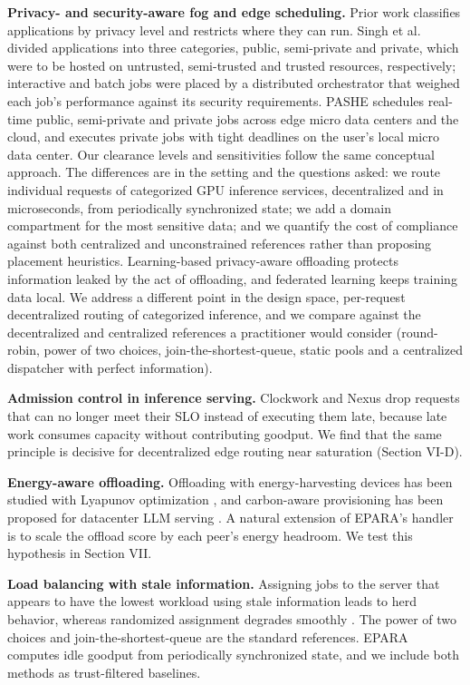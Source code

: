 \documentclass[journal]{IEEEtran}
\begin{document}
\textbf{Privacy- and security-aware fog and edge scheduling.} Prior work classifies applications by privacy level and restricts where they can run. Singh et al. \cite{singh2021fog} divided applications into three categories, public, semi-private and private, which were to be hosted on untrusted, semi-trusted and trusted resources, respectively; interactive and batch jobs were placed by a distributed orchestrator that weighed each job's performance against its security requirements. PASHE \cite{fizza2018pashe} schedules real-time public, semi-private and private jobs across edge micro data centers and the cloud, and executes private jobs with tight deadlines on the user's local micro data center. Our clearance levels and sensitivities follow the same conceptual approach. The differences are in the setting and the questions asked: we route individual requests of categorized GPU inference services, decentralized and in microseconds, from periodically synchronized state; we add a domain compartment for the most sensitive data; and we quantify the cost of compliance against both centralized and unconstrained references rather than proposing placement heuristics. Learning-based privacy-aware offloading \cite{min2019privacy} protects information leaked by the act of offloading, and federated learning \cite{mcmahan2017fl} keeps training data local. We address a different point in the design space, per-request decentralized routing of categorized inference, and we compare against the decentralized and centralized references a practitioner would consider (round-robin, power of two choices, join-the-shortest-queue, static pools and a centralized dispatcher with perfect information).

\textbf{Admission control in inference serving.} Clockwork \cite{clockwork} and Nexus \cite{nexus} drop requests that can no longer meet their SLO instead of executing them late, because late work consumes capacity without contributing goodput. We find that the same principle is decisive for decentralized edge routing near saturation (Section VI-D).

\textbf{Energy-aware offloading.} Offloading with energy-harvesting devices has been studied with Lyapunov optimization \cite{mao2016harvest}, and carbon-aware provisioning has been proposed for datacenter LLM serving \cite{ecoserve}. A natural extension of EPARA's handler is to scale the offload score by each peer's energy headroom. We test this hypothesis in Section VII.

\textbf{Load balancing with stale information.} Assigning jobs to the server that appears to have the lowest workload using stale information leads to herd behavior, whereas randomized assignment degrades smoothly \cite{mitzenmacher2000old}. The power of two choices \cite{mitzenmacher2001two} and join-the-shortest-queue \cite{winston1977} are the standard references. EPARA computes idle goodput from periodically synchronized state, and we include both methods as trust-filtered baselines.
\end{document}
